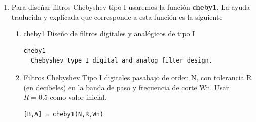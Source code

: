 \begin{enumerate}
\begin{enumerate}
                \item   Filtros Butterworth digitales suprimebanda de orden N y frecuencia de corte Wn
                Tenemos que escribir
\begin{verbatim}
[B,A] = butter(N,[W1 W2],'stop')                        
\end{verbatim}
                para dise\~{n}ar un filtro suprimebanda, donde W1 y W2 son las frecuencias inferior y
                superior de la banda de rechazo.

                \item   Ceros y polos de los filtros Butterworth
                Si queremos obtener los ceros y polos de los filtros Butterworth, debemos usar
                tres variables a la izquierda del signo $=$. Por ejemplo
\begin{verbatim}
[Z,P,K] = butter(N,Wn,'stop')
\end{verbatim}
              son los ceros, polos y ganancia de un filtro suprimebanda de orden N y banda rechazada entre
              W1 y W2.
        
                \item   Filtros anal\'{o}gicos
\begin{verbatim}
 butter(N,Wn,'s')
 butter(N,Wn,'high','s')
 butter(N,Wn,'stop','s')
\end{verbatim}
                son las \'{o}rdenes que generan filtros de tiempo continuo.
        \end{enumerate}
        
        \item   Para dise\'{n}ar  filtros Chebyshev tipo I usaremos la   funci\'{o}n \textbf{cheby1}.
        La ayuda traducida y explicada que corresponde a esta funci\'{o}n es la siguiente
        \begin{enumerate}
                \item cheby1 Dise\~{n}o de filtros digitales y anal\'{o}gicos de tipo I
\begin{verbatim}
cheby1 
  Chebyshev type I digital and analog filter design.
\end{verbatim}
                
                \item   Filtros Chebyshev Tipo I digitales pasabajo de orden N, con tolerancia R
                        (en decibeles) en la banda de paso  y frecuencia de corte Wn. 
                        Usar $R = 0.5$ como valor inicial.
\begin{verbatim}
[B,A] = cheby1(N,R,Wn)
\end{verbatim}
                

\end{enumerate}
\end{enumerate}
